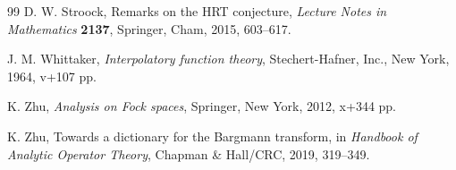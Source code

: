 \documentclass[reqno,11pt]{amsart}
\begin{document}
\begin{thebibliography}{99}
D. W. Stroock, Remarks on the HRT conjecture,
{\sl Lecture Notes in Mathematics} \textbf{2137}, 
Springer, Cham, 2015, 603--617.

 J. M. Whittaker, 
{\sl Interpolatory function theory},
Stechert-Hafner, Inc., New York, 1964, v+107 pp.

K. Zhu,  {\sl Analysis on Fock spaces}, Springer, New York, 2012, x+344 pp.

K. Zhu, Towards a dictionary for the Bargmann transform,
in {\sl Handbook of Analytic Operator Theory}, Chapman \& Hall/CRC, 2019,
319--349.

\end{thebibliography}
\end{document}
